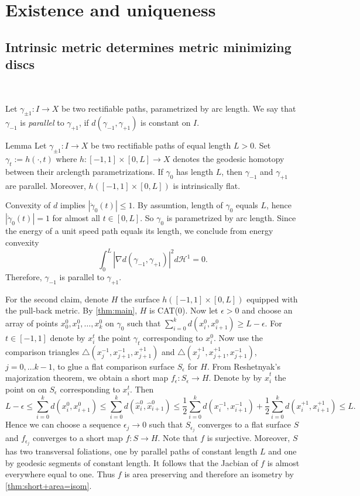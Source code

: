 \documentclass[a4paper,10pt]{amsart}
\begin{document}
\section{Existence and uniqueness}




\subsection{Intrinsic metric determines metric minimizing discs}~

\medskip
Let $\gamma_{\pm 1}:I\to X$ be two rectifiable paths, parametrized by arc length. We say that  $\gamma_{-1}$ is {\em parallel} to $\gamma_{+1}$, if $d(\gamma_{-1},\gamma_{+1})$
is constant on $I$.


\begin{thm}{Lemma}\label{lem:parpaths}
Let $\gamma_{\pm 1}:I\to X$ be two rectifiable paths of equal length $L>0$. Set $\gamma_t:=h(\cdot,t)$ where $h:[-1,1]\times[0,L]\to X$ denotes the geodesic homotopy
between their arclength parametrizations. If $\gamma_0$ has length $L$, then $\gamma_{-1}$ and $\gamma_{+1}$ are parallel. Moreover, $h([-1,1]\times[0,L])$ is intrinsically 
flat.
\end{thm}
Convexity of $d$ implies $|\dot\gamma_0(t)|\leq 1$. By assumtion, length of $\gamma_0$ equals $L$, hence $|\dot\gamma_0(t)|=1$ for almost all $t\in[0,L]$. So $\gamma_0$
is parametrized by arc length. Since the energy of a unit speed path equals its length, we conclude from energy convexity 
$$
\int_0^L|\nabla d(\gamma_{-1},\gamma_{+1})|^2 d\mathcal{H}^1=0.
$$
Therefore, $\gamma_{-1}$ is parallel to $\gamma_{+1}$.

For the second claim, denote $H$ the surface $h([-1,1]\times[0,L])$ equipped with the pull-back metric. By \ref{thm:main}, $H$
is CAT(0).
Now let $\epsilon>0$ and choose an array of points $x_0^{0},x_1^{0},\ldots,x_k^{0}$ on $\gamma_{0}$ 
such that $\sum_{i=0}^k d(x_i^{0},x_{i+1}^{0})\geq L-\epsilon$. For $t\in[-1,1]$ denote by $x_i^{t}$ the
point $\gamma_t$ corresponding to $x_i^{0}$. Now use the comparison triangles
$\triangle(x_{j}^{-1},x_{j+1}^{-1},x_{j+1}^{+1})$ and $\triangle(x_{j}^{+1},x_{j+1}^{+1},x_{j+1}^{-1})$, $j=0,\ldots k-1$,
to glue a flat comparison surface $S_\epsilon$ for $H$. From Reshetnyak's majorization theorem, we obtain a short map 
$f_\epsilon:S_\epsilon\to H$. Denote by by $\hat x_i^{t}$ the point on on $S_\epsilon$ corresponding to $x_i^{t}$. Then
$$
L-\epsilon\leq\sum_{i=0}^k d(x_i^{0},x_{i+1}^{0})\leq\sum_{i=0}^k d(\hat x_i^{0},\hat x_{i+1}^{0})\leq
\frac{1}{2}\sum_{i=0}^k d(x_i^{-1}, x_{i+1}^{-1})+\frac{1}{2}\sum_{i=0}^k d(x_i^{+1}, x_{i+1}^{+1})\leq L.
$$
Hence we can choose a sequence $\epsilon_j\to 0$ such that $S_{\epsilon_j}$ converges to a flat surface $S$ and $f_{\epsilon_j}$
converges to a short map $f:S\to H$. Note that $f$ is surjective. Moreover, $S$
has two transversal foliations, one by parallel paths of constant length $L$ and one by geodesic segments of constant length.
It follows that the Jacbian of $f$ is almost everywhere equal to one. Thus $f$ is area preserving and therefore an isometry by \ref{thm:short+area=isom}.
\qeds
\end{document}
